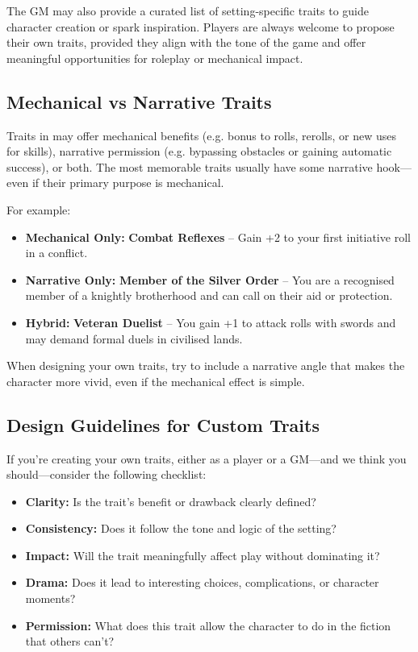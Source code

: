 The GM may also provide a curated list of setting-specific traits to guide character creation or spark inspiration. Players are always welcome to propose their own traits, provided they align with the tone of the game and offer meaningful opportunities for roleplay or mechanical impact.

\subsection{Mechanical vs Narrative Traits}

Traits in \wyrd may offer mechanical benefits (e.g. bonus to rolls, rerolls, or new uses for skills), narrative permission (e.g. bypassing obstacles or gaining automatic success), or both. The most memorable traits usually have some narrative hook—even if their primary purpose is mechanical.

For example:
\begin{itemize}
    \item \textbf{Mechanical Only:} \textbf{Combat Reflexes} – Gain +2 to your first initiative roll in a conflict.
    \item \textbf{Narrative Only:} \textbf{Member of the Silver Order} – You are a recognised member of a knightly brotherhood and can call on their aid or protection.
    \item \textbf{Hybrid:} \textbf{Veteran Duelist} – You gain +1 to attack rolls with swords and may demand formal duels in civilised lands.
\end{itemize}

When designing your own traits, try to include a narrative angle that makes the character more vivid, even if the mechanical effect is simple.

\subsection{Design Guidelines for Custom Traits}

If you're creating your own traits, either as a player or a GM---and we think you should---consider the following checklist:

\begin{itemize}
    \item \textbf{Clarity:} Is the trait’s benefit or drawback clearly defined?
    \item \textbf{Consistency:} Does it follow the tone and logic of the setting?
    \item \textbf{Impact:} Will the trait meaningfully affect play without dominating it?
    \item \textbf{Drama:} Does it lead to interesting choices, complications, or character moments?
    \item \textbf{Permission:} What does this trait allow the character to do in the fiction that others can’t?
\end{itemize}

